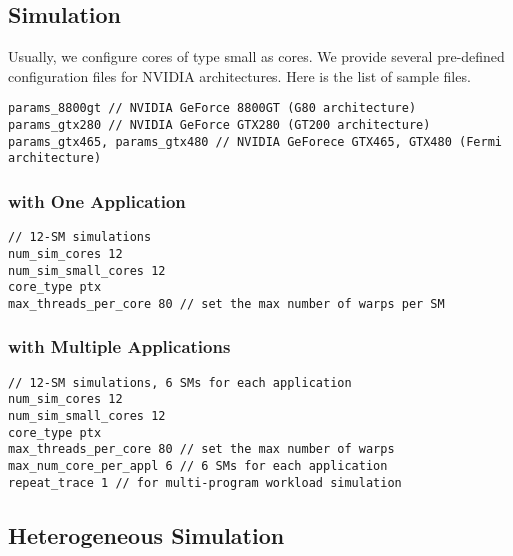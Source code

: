 \subsection{\gpu Simulation}

Usually, we configure cores of type small as \gpu cores. We provide
several pre-defined configuration files for NVIDIA architectures. Here
is the list of sample files.

\begin{Verbatim}
params_8800gt // NVIDIA GeForce 8800GT (G80 architecture)
params_gtx280 // NVIDIA GeForce GTX280 (GT200 architecture)
params_gtx465, params_gtx480 // NVIDIA GeForece GTX465, GTX480 (Fermi architecture)
\end{Verbatim}


\subsubsection{\gpu with One Application}

\begin{Verbatim}
// 12-SM simulations
num_sim_cores 12
num_sim_small_cores 12
core_type ptx
max_threads_per_core 80 // set the max number of warps per SM
\end{Verbatim}


\subsubsection{\gpu with Multiple Applications}

\begin{Verbatim}
// 12-SM simulations, 6 SMs for each application
num_sim_cores 12
num_sim_small_cores 12
core_type ptx
max_threads_per_core 80 // set the max number of warps 
max_num_core_per_appl 6 // 6 SMs for each application
repeat_trace 1 // for multi-program workload simulation
\end{Verbatim}


\subsection{Heterogeneous Simulation}

